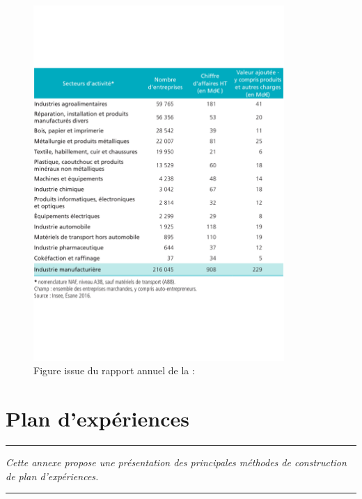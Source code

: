 \begin{figure}[hbt]
	\centering
	\includegraphics[width=0.85\textwidth,height=\textheight,keepaspectratio]{../Chap1/Figures/2018-Chiffres-cles-industrie-manufacturiere-secteur.pdf}
	\caption{Figure issue du rapport annuel de la \citeauthor{directiongeneraledesentreprises_chiffres_2019} :   \cite{directiongeneraledesentreprises_chiffres_2019}}
	\label{fig:molding_economy}
\end{figure}


\FloatBarrier
\chapter{Plan d'expériences}
\label{Ann:doe}


\begin{center}
	\rule{0.7\linewidth}{.5pt}
	\begin{minipage}{0.7\linewidth}
		\smallskip
		
		\textit{
			Cette annexe propose une présentation des principales méthodes de construction de plan d'expériences.
		}
		
	\end{minipage}
	\smallskip
	\rule{0.7\linewidth}{.5pt}
\end{center}

